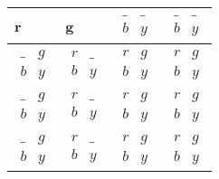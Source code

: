 \documentclass[a4paper]{article}
\begin{document}
\begin{tabular}{|l|l|l|l|}
\hline
r & g & $\begin{matrix}   \_ & \_ \\   b & y  \end{matrix}$ & $\begin{matrix}   \_ & \_ \\   b & y  \end{matrix}$ \\ \hline
$\begin{matrix}   \_ & g \\   b & y  \end{matrix}$ & $\begin{matrix}   r & \_ \\   b & y  \end{matrix}$ & $\begin{matrix}   r & g \\   b & y  \end{matrix}$ & $\begin{matrix}   r & g \\   b & y  \end{matrix}$ \\ \hline
$\begin{matrix}   \_ & g \\   b & y  \end{matrix}$ & $\begin{matrix}   r & \_ \\   b & y  \end{matrix}$ & $\begin{matrix}   r & g \\   b & y  \end{matrix}$ & $\begin{matrix}   r & g \\   b & y  \end{matrix}$ \\ \hline
$\begin{matrix}   \_ & g \\   b & y  \end{matrix}$ & $\begin{matrix}   r & \_ \\   b & y  \end{matrix}$ & $\begin{matrix}   r & g \\   b & y  \end{matrix}$ & $\begin{matrix}   r & g \\   b & y  \end{matrix}$ \\ \hline
\end{tabular}\\\\
\end{document}
